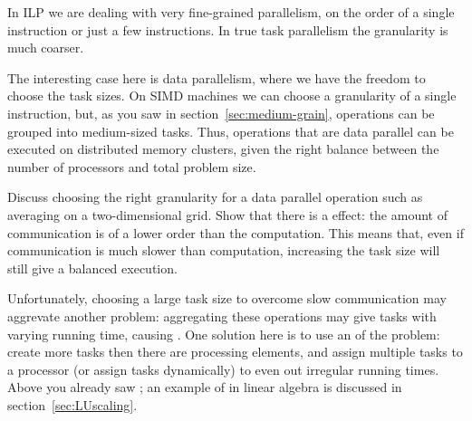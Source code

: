 In \ac{ILP} we are dealing with very fine-grained parallelism, on the
order of a single instruction or just a few instructions. In true task
parallelism the granularity is much coarser.

The interesting case here is data parallelism, where we have the
freedom to choose the task sizes. On \ac{SIMD} machines we can choose
a granularity of a single instruction, but, as you saw in
section~\ref{sec:medium-grain}, operations can be grouped into
medium-sized tasks. Thus, operations that are data parallel can be
executed on distributed memory clusters, given the right balance
between the number of processors and total problem size.

\begin{exercise}
  Discuss choosing the right granularity for a data parallel operation
  such as averaging on a two-dimensional grid. Show that there is a
   effect: the amount of communication is
  of a lower order than the computation. This means that, even if
  communication is much slower than computation, increasing the task
  size will still give a balanced execution.
\end{exercise}

Unfortunately, choosing a large task size to overcome slow
communication may aggrevate another problem: aggregating these
operations may give tasks with varying running time, causing
.  One solution here is to use an
 of the problem: create more tasks then
there are processing elements, and assign multiple tasks to a
processor (or assign tasks dynamically) to even out irregular running
times. Above you already saw ; 
an example of  in linear algebra is
discussed in section~\ref{sec:LUscaling}.

